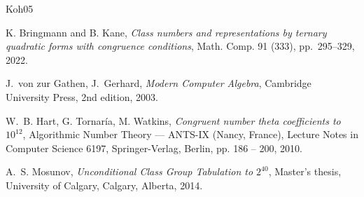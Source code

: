 \documentclass[a4paper,10pt]{article}
\begin{document}
\begin{thebibliography}{Koh05}




\normalsize
\baselineskip=17pt

K. Bringmann and B. Kane,
\emph{Class numbers and representations by ternary quadratic forms with congruence conditions}, Math. Comp. 91 (333), pp.\ 295--329, 2022.

J.\ von zur Gathen, J.\ Gerhard,
\emph{Modern Computer Algebra},
Cambridge University Press, 2nd edition, 2003.

W.~B. Hart, G. Tornar\'ia, M. Watkins,
\emph{Congruent number theta coefficients to $10^{12}$},
Algorithmic Number Theory --- ANTS-IX (Nancy, France), Lecture Notes in Computer Science 6197, Springer-Verlag, Berlin, pp. 186 -- 200,  2010.

A.~S. Mosunov,
\emph{Unconditional Class Group Tabulation to $2^{40}$},
Master's thesis, University of Calgary, Calgary, Alberta, 2014.

\end{thebibliography}
\end{document}

